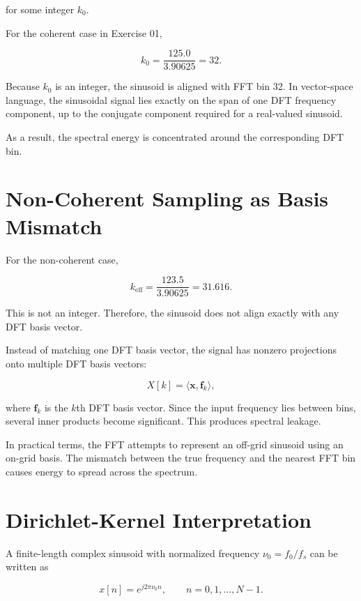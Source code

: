 ﻿\documentclass[11pt]{article}
\begin{document}
for some integer $k_0$.

For the coherent case in Exercise 01,

\begin{equation}
k_0
=
\frac{125.0}{3.90625}
=
32.
\end{equation}

Because $k_0$ is an integer, the sinusoid is aligned with FFT bin 32. In vector-space language, the sinusoidal signal lies exactly on the span of one DFT frequency component, up to the conjugate component required for a real-valued sinusoid.

As a result, the spectral energy is concentrated around the corresponding DFT bin.

\section{Non-Coherent Sampling as Basis Mismatch}

For the non-coherent case,

\begin{equation}
k_{\text{eff}}
=
\frac{123.5}{3.90625}
=
31.616.
\end{equation}

This is not an integer. Therefore, the sinusoid does not align exactly with any DFT basis vector.

Instead of matching one DFT basis vector, the signal has nonzero projections onto multiple DFT basis vectors:

\begin{equation}
X[k]
=
\langle \bm{x}, \bm{f}_k \rangle,
\end{equation}

where $\bm{f}_k$ is the $k$th DFT basis vector. Since the input frequency lies between bins, several inner products become significant. This produces spectral leakage.

In practical terms, the FFT attempts to represent an off-grid sinusoid using an on-grid basis. The mismatch between the true frequency and the nearest FFT bin causes energy to spread across the spectrum.

\section{Dirichlet-Kernel Interpretation}

A finite-length complex sinusoid with normalized frequency $\nu_0 = f_0/f_s$ can be written as

\begin{equation}
x[n] = e^{j2\pi \nu_0 n}, \qquad n = 0,1,\ldots,N-1.
\end{equation}
\end{document}
